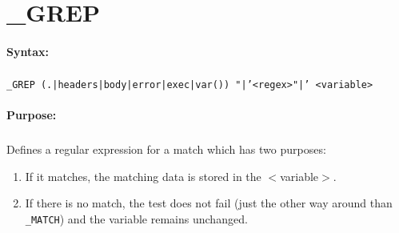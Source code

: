 
\newpage
\section{\_GREP}
\label{cmd:_GREP}

\paragraph{Syntax:}
\subparagraph{}
\texttt{\_GREP (.|headers|body|error|exec|var()) "|'<regex>"|' <variable>}

\paragraph{Purpose:}
\subparagraph{}
Defines a regular expression for a match which has two purposes:

\begin{enumerate}
\item If it matches, the matching data is stored in the $<$variable$>$.
\item If there is no match, the test does not fail (just the other way
      around than \texttt{\_MATCH}) and the variable remains unchanged.
\end{enumerate}
